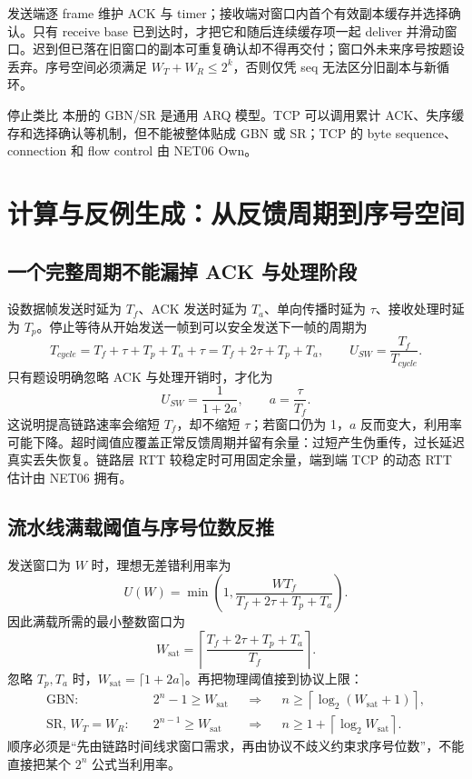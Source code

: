 \documentclass[UTF8,fontset=none,11pt,a4paper]{ctexart}
\begin{document}
发送端逐 frame 维护 ACK 与 timer；接收端对窗口内首个有效副本缓存并选择确认。只有 receive base 已到达时，才把它和随后连续缓存项一起 deliver 并滑动窗口。迟到但已落在旧窗口的副本可重复确认却不得再交付；窗口外未来序号按题设丢弃。序号空间必须满足 $W_T+W_R\le 2^k$，否则仅凭 seq 无法区分旧副本与新循环。

\begin{warnbox}{停止类比}
本册的 GBN/SR 是通用 ARQ 模型。TCP 可以调用累计 ACK、失序缓存和选择确认等机制，但不能被整体贴成 GBN 或 SR；TCP 的 byte sequence、connection 和 flow control 由 NET06 Own。
\end{warnbox}

\section{计算与反例生成：从反馈周期到序号空间}

\subsection{一个完整周期不能漏掉 ACK 与处理阶段}

设数据帧发送时延为 $T_f$、ACK 发送时延为 $T_a$、单向传播时延为 $\tau$、接收处理时延为 $T_p$。停止等待从开始发送一帧到可以安全发送下一帧的周期为
\[
T_{cycle}=T_f+\tau+T_p+T_a+\tau
=T_f+2\tau+T_p+T_a,
\qquad
U_{SW}=\frac{T_f}{T_{cycle}}.
\]
只有题设明确忽略 ACK 与处理开销时，才化为
\[
U_{SW}=\frac{1}{1+2a},\qquad a=\frac{\tau}{T_f}.
\]
这说明提高链路速率会缩短 $T_f$，却不缩短 $\tau$；若窗口仍为 1，$a$ 反而变大，利用率可能下降。超时阈值应覆盖正常反馈周期并留有余量：过短产生伪重传，过长延迟真实丢失恢复。链路层 RTT 较稳定时可用固定余量，端到端 TCP 的动态 RTT 估计由 NET06 拥有。

\subsection{流水线满载阈值与序号位数反推}

发送窗口为 $W$ 时，理想无差错利用率为
\[
U(W)=\min\!\left(1,\frac{W T_f}{T_f+2\tau+T_p+T_a}\right).
\]
因此满载所需的最小整数窗口为
\[
W_{\mathrm{sat}}
=\left\lceil\frac{T_f+2\tau+T_p+T_a}{T_f}\right\rceil.
\]
忽略 $T_p,T_a$ 时，$W_{\mathrm{sat}}=\lceil1+2a\rceil$。再把物理阈值接到协议上限：
\[
\begin{aligned}
\text{GBN:}\quad &2^n-1\ge W_{\mathrm{sat}}
&&\Longrightarrow&& n\ge\left\lceil\log_2(W_{\mathrm{sat}}+1)\right\rceil,\\
\text{SR, }W_T=W_R:\quad &2^{n-1}\ge W_{\mathrm{sat}}
&&\Longrightarrow&& n\ge1+\left\lceil\log_2W_{\mathrm{sat}}\right\rceil.
\end{aligned}
\]
顺序必须是“先由链路时间线求窗口需求，再由协议不歧义约束求序号位数”，不能直接把某个 $2^n$ 公式当利用率。
\end{document}
